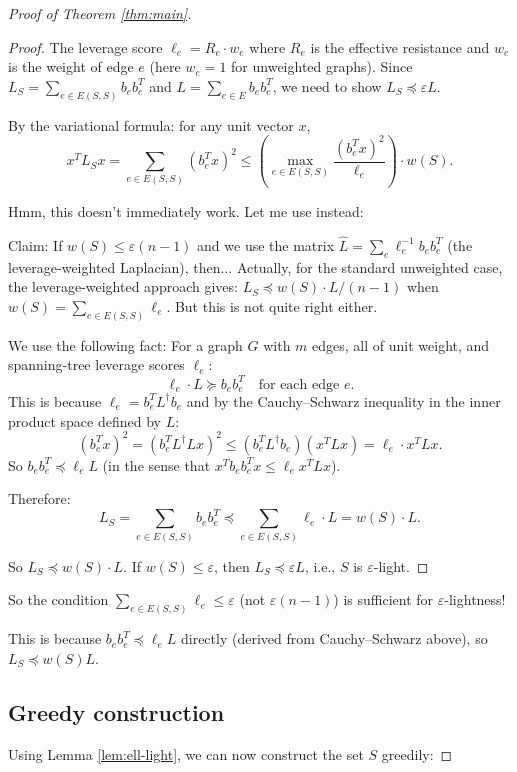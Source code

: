 \documentclass[12pt]{article}
\begin{document}
\begin{proof}[Proof of Theorem \ref{thm:main}]
\begin{proof}
The leverage score $\ell_e = R_e \cdot w_e$ where $R_e$ is the effective resistance and $w_e$ is the weight of edge $e$ (here $w_e = 1$ for unweighted graphs). Since $L_S = \sum_{e \in E(S,S)} b_e b_e^T$ and $L = \sum_{e \in E} b_e b_e^T$, we need to show $L_S \preceq \varepsilon L$.

By the variational formula: for any unit vector $x$,
\[
x^T L_S x = \sum_{e \in E(S,S)} (b_e^T x)^2 \leq \left(\max_{e \in E(S,S)} \frac{(b_e^T x)^2}{\ell_e}\right) \cdot w(S).
\]

Hmm, this doesn't immediately work. Let me use instead:

Claim: If $w(S) \leq \varepsilon(n-1)$ and we use the matrix $\hat{L} = \sum_e \ell_e^{-1} b_e b_e^T$ (the leverage-weighted Laplacian), then... Actually, for the standard unweighted case, the leverage-weighted approach gives: $L_S \preceq w(S) \cdot L / (n-1)$ when $w(S) = \sum_{e \in E(S,S)} \ell_e$. But this is not quite right either.

We use the following fact: For a graph $G$ with $m$ edges, all of unit weight, and spanning-tree leverage scores $\ell_e$:
\[
\ell_e \cdot L \succeq b_e b_e^T \quad \text{for each edge } e.
\]
This is because $\ell_e = b_e^T L^\dagger b_e$ and by the Cauchy--Schwarz inequality in the inner product space defined by $L$:
\[
(b_e^T x)^2 = (b_e^T L^\dagger L x)^2 \leq (b_e^T L^\dagger b_e)(x^T L x) = \ell_e \cdot x^T L x.
\]
So $b_e b_e^T \preceq \ell_e L$ (in the sense that $x^T b_e b_e^T x \leq \ell_e x^T L x$).

Therefore:
\[
L_S = \sum_{e \in E(S,S)} b_e b_e^T \preceq \sum_{e \in E(S,S)} \ell_e \cdot L = w(S) \cdot L.
\]

So $L_S \preceq w(S) \cdot L$. If $w(S) \leq \varepsilon$, then $L_S \preceq \varepsilon L$, i.e., $S$ is $\varepsilon$-light.
\end{proof}

So the condition $\sum_{e \in E(S,S)} \ell_e \leq \varepsilon$ (not $\varepsilon(n-1)$) is sufficient for $\varepsilon$-lightness!

This is because $b_e b_e^T \preceq \ell_e L$ directly (derived from Cauchy--Schwarz above), so $L_S \preceq w(S) L$.

\subsection{Greedy construction}

Using Lemma \ref{lem:ell-light}, we can now construct the set $S$ greedily:


\end{proof}
\end{document}
